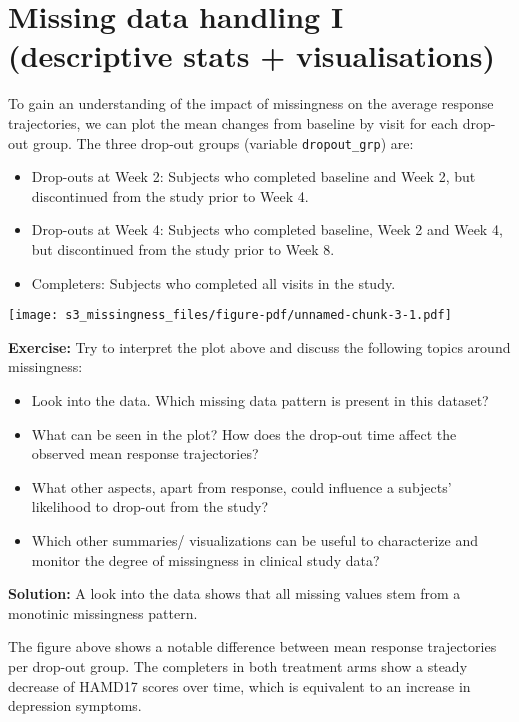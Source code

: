 \documentclass[
  letterpaper,
  DIV=11,
  numbers=noendperiod]{scrreprt}
\begin{document}
\hypertarget{missing-data-handling-i-descriptive-stats-visualisations}{%
\section{Missing data handling I (descriptive stats +
visualisations)}\label{missing-data-handling-i-descriptive-stats-visualisations}}

To gain an understanding of the impact of missingness on the average
response trajectories, we can plot the mean changes from baseline by
visit for each drop-out group. The three drop-out groups (variable
\texttt{dropout\_grp}) are:

\begin{itemize}
\item
  Drop-outs at Week 2: Subjects who completed baseline and Week 2, but
  discontinued from the study prior to Week 4.
\item
  Drop-outs at Week 4: Subjects who completed baseline, Week 2 and Week
  4, but discontinued from the study prior to Week 8.
\item
  Completers: Subjects who completed all visits in the study.
\end{itemize}

\texttt{[image: s3\_missingness\_files/figure-pdf/unnamed-chunk-3-1.pdf]}

\textbf{Exercise:} Try to interpret the plot above and discuss the
following topics around missingness:

\begin{itemize}
\item
  Look into the data. Which missing data pattern is present in this
  dataset?
\item
  What can be seen in the plot? How does the drop-out time affect the
  observed mean response trajectories?
\item
  What other aspects, apart from response, could influence a subjects'
  likelihood to drop-out from the study?
\item
  Which other summaries/ visualizations can be useful to characterize
  and monitor the degree of missingness in clinical study data?
\end{itemize}

\textbf{Solution:} A look into the data shows that all missing values
stem from a monotinic missingness pattern.

The figure above shows a notable difference between mean response
trajectories per drop-out group. The completers in both treatment arms
show a steady decrease of HAMD17 scores over time, which is equivalent
to an increase in depression symptoms.
\end{document}
